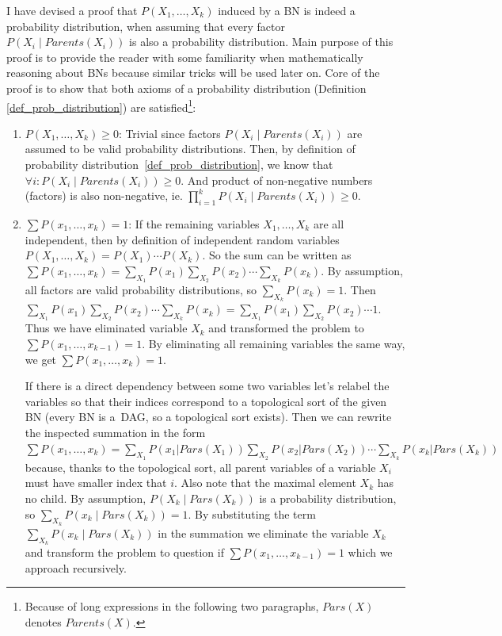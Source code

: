 \documentclass[english,cover]{fitthesis} %
\begin{document}
I have devised a proof that $P(X_1, \dots, X_k)$ induced by a BN is indeed a probability distribution, when assuming that every factor $P(X_i \mid Parents(X_i))$ is also a probability distribution. Main purpose of this proof is to provide the reader with some familiarity when mathematically reasoning about BNs because similar tricks will be used later on. Core of the proof is to show that both axioms of a probability distribution (Definition \ref{def_prob_distribution}) are satisfied\footnote{Because of long expressions in the following two paragraphs, $Pars(X)$ denotes $Parents(X)$.}:
\begin{enumerate}
   \item $P(X_1, \dots, X_k) \geq 0$:
       Trivial since factors $P(X_i \mid Parents(X_i))$ are assumed to be valid probability distributions. Then, by definition of probability distribution~\ref{def_prob_distribution}, we know that $\forall i: P(X_i \mid Parents(X_i)) \geq 0$. And product of non-negative numbers (factors) is also non-negative, ie. $\prod_{i=1}^k P(X_i \mid Parents(X_i)) \geq 0$.
   \item $\sum P(x_1, \dots, x_k) = 1$: If the remaining variables $X_1, \dots, X_k$ are all independent, then by definition of independent random variables $P(X_1, \dots, X_k) = P(X_1) \dotsm P(X_k)$. So the sum can be written as $\sum P(x_1, \dots, x_k) = \sum_{X_1} P(x_1) \sum_{X_2} P(x_2) \dotsm \sum_{X_k} P(x_k)$. By assumption, all factors are valid probability distributions, so $\sum_{X_k} P(x_k) = 1$. Then $\sum_{X_1} P(x_1) \sum_{X_2} P(x_2) \dotsm \sum_{X_k} P(x_k) = \sum_{X_1} P(x_1) \sum_{X_2} P(x_2) \dotsm 1$. Thus we have eliminated variable $X_k$ and transformed the problem to $\sum P(x_1, \dots, x_{k-1}) = 1$. By eliminating all remaining variables the same way, we get $\sum P(x_1, \dots, x_k) = 1$.
       
       If there is a direct dependency between some two variables let's relabel the variables so that their indices correspond to a topological sort of the given BN (every BN is a~DAG, so a topological sort exists).  Then we can rewrite the inspected summation in the form $\sum P(x_1, \dots, x_k) = \sum_{X_1} P(x_1 | Pars(X_1)) \sum_{X_2} P(x_2 | Pars(X_2)) \dotsm \sum_{X_k} P(x_k | Pars(X_k))$ because, thanks to the topological sort, all parent variables of a variable $X_i$ must have smaller index that $i$. Also note that the maximal element $X_k$ has no child. By assumption, $P(X_k \mid Pars(X_k))$ is a probability distribution, so $\sum_{X_k} P(x_k \mid Pars(X_k)) = 1$. By substituting the term $\sum_{X_k} P(x_k \mid Pars(X_k))$ in the summation we eliminate the variable $X_k$ and transform the problem to question if $\sum P(x_1, \dots, x_{k-1}) = 1$ which we approach recursively.
\end{enumerate}
\end{document}
